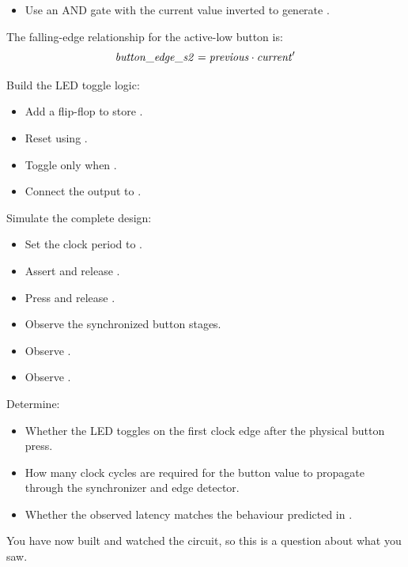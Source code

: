 \begin{parts}
\begin{itemize}
\begin{itemize}
        \end{itemize}
      \item Use an AND gate with the current value inverted to generate .
    \end{itemize}
    The falling-edge relationship for the active-low button is:
    \[ \mathit{button\_edge\_s2} = \mathit{previous} \cdot \mathit{current}' \]
  \item Build the LED toggle logic:
    \begin{itemize}
      \item Add a flip-flop to store .
      \item Reset  using .
      \item Toggle  only when .
      \item Connect the  output to .
    \end{itemize}
  \item Simulate the complete design:
    \begin{itemize}
      \item Set the clock period to .
      \item Assert and release .
      \item Press and release .
      \item Observe the synchronized button stages.
      \item Observe .
      \item Observe .
    \end{itemize}
    Determine:
    \begin{itemize}
      \item Whether the LED toggles on the first clock edge after the physical button press.
      \item How many clock cycles are required for the button value to propagate through the
        synchronizer and edge detector.
      \item Whether the observed latency matches the behaviour predicted in .
    \end{itemize}
\end{parts}

\label{c4:set:4}

\label{c4:ex:7}
You have now built and watched the circuit, so this is a question about what you saw.

